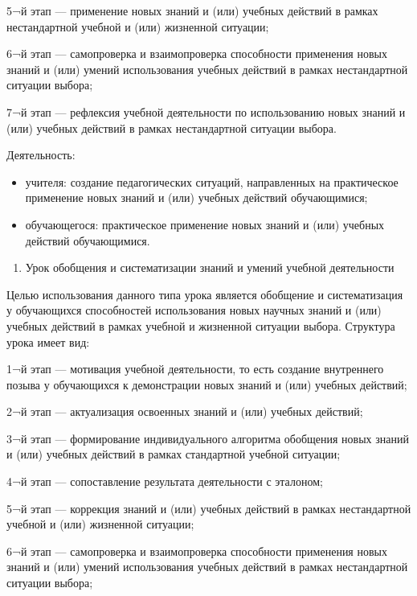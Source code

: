 \documentclass[
  11pt,
  russian,
]{book}
\providecommand{\tightlist}{%
  \setlength{\itemsep}{0pt}\setlength{\parskip}{0pt}}
\begin{document}
5¬й этап --- применение новых знаний и (или) учебных действий в рамках
нестандартной учебной и (или) жизненной ситуации;

6¬й этап --- самопроверка и взаимопроверка способности применения новых
знаний и (или) умений использования учебных действий в рамках
нестандартной ситуации выбора;

7¬й этап --- рефлексия учебной деятельности по использованию новых
знаний и (или) учебных действий в рамках нестандартной ситуации выбора.

Деятельность:

\begin{itemize}
\item
  учителя: создание педагогических ситуаций, направленных на
  практическое применение новых знаний и (или) учебных действий
  обучающимися;
\item
  обучающегося: практическое применение новых знаний и (или) учебных
  действий обучающимися.
\end{itemize}

\begin{enumerate}
\def\labelenumi{\arabic{enumi}.}
\setcounter{enumi}{2}
\tightlist
\item
  Урок обобщения и систематизации знаний и умений учебной деятельности
\end{enumerate}

Целью использования данного типа урока является обобщение и
систематизация у обучающихся способностей использования новых научных
знаний и (или) учебных действий в рамках учебной и жизненной ситуации
выбора. Структура урока имеет вид:

1¬й этап --- мотивация учебной деятельности, то есть создание
внутреннего позыва у обучающихся к демонстрации новых знаний и (или)
учебных действий;

2¬й этап --- актуализация освоенных знаний и (или) учебных действий;

3¬й этап --- формирование индивидуального алгоритма обобщения новых
знаний и (или) учебных действий в рамках стандартной учебной ситуации;

4¬й этап --- сопоставление результата деятельности с эталоном;

5¬й этап --- коррекция знаний и (или) учебных действий в рамках
нестандартной учебной и (или) жизненной ситуации;

6¬й этап --- самопроверка и взаимопроверка способности применения новых
знаний и (или) умений использования учебных действий в рамках
нестандартной ситуации выбора;
\end{document}

